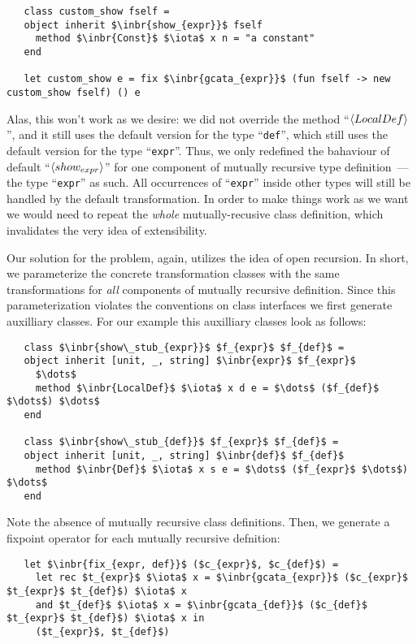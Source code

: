 \begin{lstlisting}
   class custom_show fself =
   object inherit $\inbr{show_{expr}}$ fself
     method $\inbr{Const}$ $\iota$ x n = "a constant"
   end

   let custom_show e = fix $\inbr{gcata_{expr}}$ (fun fself -> new custom_show fself) () e
\end{lstlisting}

Alas, this won't work as we desire: we did not override the method ``$\left<LocalDef\right>$'', and it still uses the default version for the type ``\lstinline{def}'', which
still uses the default version for the type ``\lstinline{expr}''. Thus, we only redefined the bahaviour of default ``$\left<show_{expr}\right>$'' for one component of
mutually recursive type definition~--- the type ``\lstinline{expr}'' as such. All occurrences of ``\lstinline{expr}'' inside other types will still be handled by
the default transformation. In order to make things work as we want we would need to repeat the \emph{whole} mutually-recusive class definition, which invalidates the
very idea of extensibility. 

Our solution for the problem, again, utilizes the idea of open recursion. In short, we parameterize the concrete transformation classes with the same transformations
for \emph{all} components of mutually recursive definition. Since this parameterization violates the conventions on class interfaces we first generate auxilliary classes.
For our example this auxilliary classes look as follows:

\begin{lstlisting}
   class $\inbr{show\_stub_{expr}}$ $f_{expr}$ $f_{def}$ =
   object inherit [unit, _, string] $\inbr{expr}$ $f_{expr}$
     $\dots$
     method $\inbr{LocalDef}$ $\iota$ x d e = $\dots$ ($f_{def}$ $\dots$) $\dots$
   end
     
   class $\inbr{show\_stub_{def}}$ $f_{expr}$ $f_{def}$ =
   object inherit [unit, _, string] $\inbr{def}$ $f_{def}$
     method $\inbr{Def}$ $\iota$ x s e = $\dots$ ($f_{expr}$ $\dots$) $\dots$
   end
\end{lstlisting}

Note the absence of mutually recursive class definitions. Then, we generate a fixpoint operator for each mutually recursive defnition:

\begin{lstlisting}
   let $\inbr{fix_{expr, def}}$ ($c_{expr}$, $c_{def}$) =
     let rec $t_{expr}$ $\iota$ x = $\inbr{gcata_{expr}}$ ($c_{expr}$ $t_{expr}$ $t_{def}$) $\iota$ x
     and $t_{def}$ $\iota$ x = $\inbr{gcata_{def}}$ ($c_{def}$ $t_{expr}$ $t_{def}$) $\iota$ x in
     ($t_{expr}$, $t_{def}$)
\end{lstlisting}

